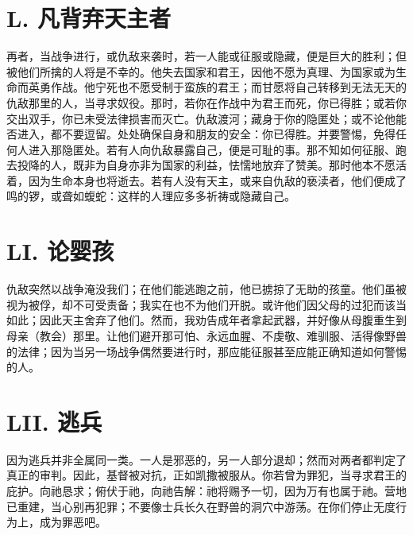 \section{L. 凡背弃天主者}

再者，当战争进行，或仇敌来袭时，若一人能或征服或隐藏，便是巨大的胜利；但被他们所擒的人将是不幸的。他失去国家和君王，因他不愿为真理、为国家或为生命而英勇作战。他宁死也不愿受制于蛮族的君王；而甘愿将自己转移到无法无天的仇敌那里的人，当寻求奴役。那时，若你在作战中为君王而死，你已得胜；或若你交出双手，你已未受法律损害而灭亡。仇敌渡河；藏身于你的隐匿处；或不论他能否进入，都不要逗留。处处确保自身和朋友的安全：你已得胜。并要警惕，免得任何人进入那隐匿处。若有人向仇敌暴露自己，便是可耻的事。那不知如何征服、跑去投降的人，既非为自身亦非为国家的利益，怯懦地放弃了赞美。那时他本不愿活着，因为生命本身也将逝去。若有人没有天主，或来自仇敌的亵渎者，他们便成了鸣的锣，或聋如蝮蛇：这样的人理应多多祈祷或隐藏自己。\par


\section{LI. 论婴孩}

仇敌突然以战争淹没我们；在他们能逃跑之前，他已掳掠了无助的孩童。他们虽被视为被俘，却不可受责备；我实在也不为他们开脱。或许他们因父母的过犯而该当如此；因此天主舍弃了他们。然而，我劝告成年者拿起武器，并好像从母腹重生到母亲（教会）那里。让他们避开那可怕、永远血腥、不虔敬、难驯服、活得像野兽的法律；因为当另一场战争偶然要进行时，那应能征服甚至应能正确知道如何警惕的人。\par


\section{LII. 逃兵}

因为逃兵并非全属同一类。一人是邪恶的，另一人部分退却；然而对两者都判定了真正的审判。因此，基督被对抗，正如凯撒被服从。你若曾为罪犯，当寻求君王的庇护。向祂恳求；俯伏于祂，向祂告解：祂将赐予一切，因为万有也属于祂。营地已重建，当心别再犯罪；不要像士兵长久在野兽的洞穴中游荡。在你们停止无度行为上，成为罪恶吧。\par


